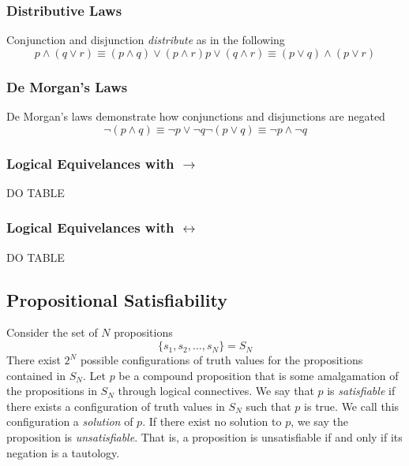 \documentclass[twocolumn]{report}
\begin{document}
\subsubsection{Distributive Laws}
Conjunction and disjunction \textit{distribute} as in the following 
\begin{subequations}
	\begin{equation}
		p\wedge(q\lor r)\equiv(p\wedge q)\lor(p\wedge r)
		\label{eqn: conjunction-distributivity}
	\end{equation}
	\begin{equation}
		p\lor(q\wedge r)\equiv(p\lor q)\wedge(p\lor r)
		\label{eqn: disjunction-distributivity}
	\end{equation}
	\label{eqn: distributive-laws}
\end{subequations}
\subsubsection{De Morgan's Laws}
De Morgan's laws demonstrate how conjunctions and disjunctions are negated
\begin{subequations}
	\label{eqn: demorgan-laws}
	\begin{equation}
		\neg (p\wedge q) \equiv \neg p \lor \neg q
		\label{eqn: negation-of-conjunction}
	\end{equation}
	\begin{equation}
		\neg (p\lor q) \equiv \neg p \wedge \neg q
		\label{eqn: negation-of-disjunction}
	\end{equation}
\end{subequations}
\subsubsection{Logical Equivelances with $\rightarrow$}
DO TABLE
\subsubsection{Logical Equivelances with $\leftrightarrow$}
DO TABLE

\subsection{Propositional Satisfiability}
Consider the set of $N$ propositions 
\[
	\{s_{1}, s_{2}, \dots, s_{N}\} = S_{N}
\]
There exist $2^{N}$ possible configurations of truth values for the propositions contained in $S_{N}$.
Let $p$ be a compound proposition that is some amalgamation of the propositions in $S_{N}$ through logical connectives. 
We say that $p$ is \textit{satisfiable} if there exists a configuration of truth values in $S_{N}$ such that $p$ is true.
We call this configuration a \textit{solution} of $p$.
If there exist no solution to $p$, we say the proposition is \textit{unsatisfiable}.
That is, a proposition is unsatisfiable if and only if its negation is a tautology. 
\end{document}
